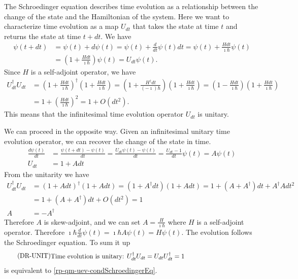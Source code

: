 The Schroedinger equation describes time evolution as a relationship between the change of the state and the Hamiltonian of the system. Here we want to characterize time evolution as a map $U_{dt}$ that takes the state at time $t$ and returns the state at time $t + dt$. We have
\begin{equation}
	\begin{aligned}
		\psi(t+dt) &= \psi(t) + d\psi(t) = \psi(t) + \frac{d}{dt} \psi(t) dt = \psi(t)+ \frac{H dt}{\imath \hbar} \psi(t)\\
		&= \left(1 + \frac{H dt}{\imath \hbar}\right)\psi(t) = U_{dt}\psi(t).
	\end{aligned}
\end{equation}
Since $H$ is a self-adjoint operator, we have
\begin{equation}
	\begin{aligned}
		U_{dt}^\dagger U_{dt} &= \left(1 + \frac{H dt}{\imath \hbar}\right)^\dagger \left(1 + \frac{H dt}{\imath \hbar}\right) = \left(1 + \frac{H^\dagger dt}{(- \imath) \hbar}\right) \left(1 + \frac{H dt}{\imath \hbar}\right) = \left(1 - \frac{H dt}{\imath \hbar}\right) \left(1 + \frac{H dt}{\imath \hbar}\right) \\
		&= 1 + \left(\frac{H dt}{\imath \hbar}\right)^2 = 1 + O(dt^2).
	\end{aligned}
\end{equation}
This means that the infinitesimal time evolution operator $U_{dt}$ is unitary.

We can proceed in the opposite way. Given an infinitesimal unitary time evolution operator, we can recover the change of the state in time.
\begin{equation}
	\begin{aligned}
		\frac{d\psi(t)}{dt} &= \frac{\psi(t+dt) - \psi(t)}{dt} = \frac{U_{dt}\psi(t) - \psi(t)}{dt} = \frac{U_{dt} - 1}{dt} \psi(t) = A \psi(t)\\
		U_{dt} &= 1 + A dt
	\end{aligned}
\end{equation}
From the unitarity we have
\begin{equation}
	\begin{aligned}
		U_{dt}^\dagger U_{dt} &= \left(1 + A dt\right)^\dagger \left(1 + A dt\right) = \left(1 + A^\dagger dt\right) \left(1 + A dt\right) = 1 + \left(A + A^\dagger\right)dt + A^\dagger A dt^2 \\
		&= 1 + \left(A + A^\dagger\right)dt + O(dt^2) = 1 \\
		A &= - A^\dagger
	\end{aligned}
\end{equation}
Therefore $A$ is skew-adjoint, and we can set $A = \frac{H}{\imath \hbar}$ where $H$ is a self-adjoint operator. Therefore $\imath \hbar \frac{d}{dt} \psi(t) = \imath \hbar A \psi(t) = H \psi(t)$. The evolution follows the Schroedinger equation. To sum it up
\begin{equation}\label{rp-qm-uev-condUnitaryEvolution}
	\tag{DR-UNIT}
	\eqtext{Time evolution is unitary: $U^{\dagger}_{dt} U_{dt} = U_{dt} U^{\dagger}_{dt} = 1$} 
\end{equation}
is equivalent to \ref{rp-qm-uev-condSchroedingerEq}.

